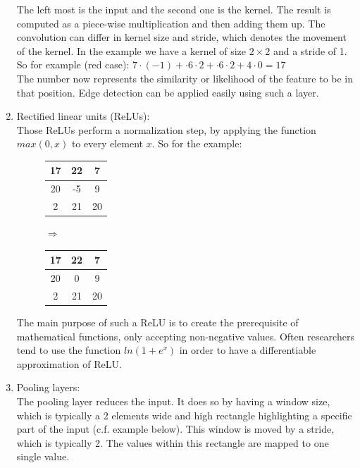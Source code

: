 \begin{enumerate}
\begin{figure}[H]
	\end{figure}
	The left most is the input and the second one is the kernel. The result is computed as a piece-wise multiplication and then adding them up. The convolution can differ in kernel size and stride, which denotes the movement of the kernel. In the example we have a kernel of size $2\times2$ and a stride of 1.\\
	So for example (red case): $7\cdot(-1)+\cdot6\cdot2+\cdot6\cdot2+4\cdot0=17$\\
	The number now represents the similarity or likelihood of the feature to be in that position. Edge detection can be applied easily using such a layer. \cite{hubel1968receptive}
\item Rectified linear units (ReLUs):\\
	Those ReLUs perform a normalization step, by applying the function $max(0,x)$ to every element $x$. So for the example:
	\begin{figure}[H]
		\centering
		\begin{tabular}{|c|c|c|} \hline
			17 & 22 & 7\\\hline
			20 & -5 & 9\\\hline
			2 & 21 & 20\\\hline
		\end{tabular}
		$\Rightarrow$
		\begin{tabular}{|c|c|c|} \hline
			17 & 22 & 7\\\hline
			20 & 0 & 9\\\hline
			2 & 21 & 20\\\hline
		\end{tabular}
	\end{figure}
	The main purpose of such a ReLU is to create the prerequisite of mathematical functions, only accepting non-negative values. Often researchers tend to use the function $ln(1+e^x)$ in order to have a differentiable approximation of ReLU. 
\item Pooling layers:\\
	The pooling layer reduces the input. It does so by having a window size, which is typically a 2 elements wide and high rectangle highlighting a specific part of the input (c.f. example below). This window is moved by a stride, which is typically 2. The values within this rectangle are mapped to one single value. 

\end{enumerate}
